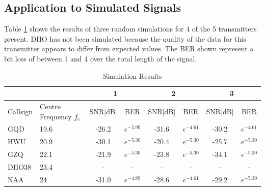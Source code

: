 \subsection{Application to Simulated Signals}\label{sec:simsignals}

Table \ref{tab:simresults1} shows the results of three random simulations for 4 of the 5 transmitters present. DHO has not been simulated because the quality of the data for this transmitter appears to differ from expected values. The BER shown represent a bit loss of between 1 and 4 over the total length of the signal.


\begin{table}[h!]
\centering
\begin{tabular}{l|l|c|c|c|c|c|c}
         &                        & \multicolumn{2}{c}{1} & \multicolumn{2}{|c}{2} & \multicolumn{2}{|c}{3} \\
         \hline
Callsign & Centre Frequency $f_c$ & SNR[dB]    & BER          & SNR[dB]    & BER          & SNR[dB]    & BER          \\
\hline
GQD      & 19.6                   & -26.2  & $e^{-5.99}$ & -31.6  & $e^{-4.61}$ & -30.2  & $e^{-4.61}$ \\
HWU      & 20.9                   & -30.1  & $e^{-5.30}$ & -20.4  & $e^{-5.30}$ & -25.7  & $e^{-5.30}$ \\
GZQ      & 22.1                   & -21.9  & $e^{-5.30}$ & -23.8  & $e^{-5.30}$ & -34.1  & $e^{-5.30}$ \\
DHO38    & 23.4                   & -      & -            & -      & -            & -      & -            \\
NAA      & 24                     & -31.0  & $e^{-4.89}$ & -28.6  & $e^{-4.61}$ & -29.2  & $e^{-5.30}$
\end{tabular}
\caption{Simulation Results}
\label{tab:simresults1}
\end{table}


